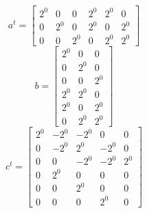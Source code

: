 \documentclass{article}%
\begin{document}
\[%
a^{t} = \left[\begin{matrix}2^{0} & 0 & 0 & 2^{0} & 2^{0} & 0\\0 & 2^{0} & 0 & 2^{0} & 0 & 2^{0}\\0 & 0 & 2^{0} & 0 & 2^{0} & 2^{0}\end{matrix}\right]%
\]%
\[%
b = \left[\begin{matrix}2^{0} & 0 & 0\\0 & 2^{0} & 0\\0 & 0 & 2^{0}\\2^{0} & 2^{0} & 0\\2^{0} & 0 & 2^{0}\\0 & 2^{0} & 2^{0}\end{matrix}\right]%
\]%
\[%
c^{t} = \left[\begin{matrix}2^{0} & - 2^{0} & - 2^{0} & 0 & 0\\0 & - 2^{0} & 2^{0} & - 2^{0} & 0\\0 & 0 & - 2^{0} & - 2^{0} & 2^{0}\\0 & 2^{0} & 0 & 0 & 0\\0 & 0 & 2^{0} & 0 & 0\\0 & 0 & 0 & 2^{0} & 0\end{matrix}\right]%
\]%
\end{document}
